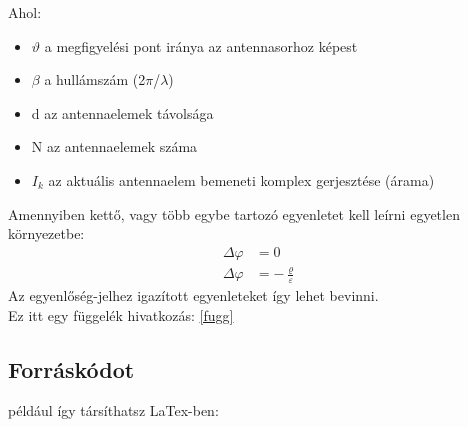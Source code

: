 Ahol:
\begin{itemize}
\item
$\vartheta$ a megfigyelési pont iránya az antennasorhoz képest
\item
$\beta$ a hullámszám (2$\pi$/$\lambda$)
\item
d az antennaelemek távolsága
\item
N az antennaelemek száma
\item
$I_k$ az aktuális antennaelem bemeneti komplex gerjesztése (árama)
\end{itemize}
Amennyiben kettő, vagy több egybe tartozó egyenletet kell leírni egyetlen környezetbe:
\begin{align}
\Delta \varphi &= 0 \\
\Delta \varphi &= -\frac{\varrho}{\varepsilon}
\end{align}
Az egyenlőség-jelhez igazított egyenleteket így lehet bevinni.
\\Ez itt egy függelék hivatkozás: \ref{fugg}

\subsection{Forráskódot}

például így társíthatsz LaTex-ben:

